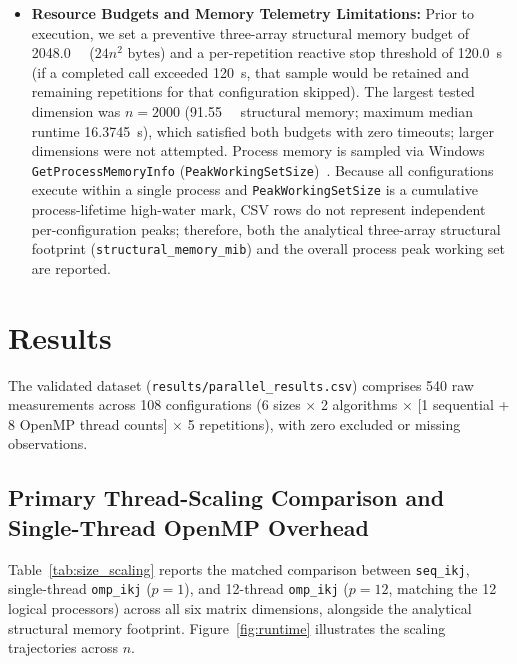 \documentclass[11pt,a4paper]{article}
\begin{document}
\begin{itemize}
    \item \textbf{Resource Budgets and Memory Telemetry Limitations:} Prior to execution, we set a preventive three-array structural memory budget of \SI{2048.0}{\mebi\byte} ($24n^2\text{ bytes}$) and a per-repetition reactive stop threshold of \SI{120.0}{\second} (if a completed call exceeded \SI{120}{\second}, that sample would be retained and remaining repetitions for that configuration skipped). The largest tested dimension was $n = 2000$ (\SI{91.55}{\mebi\byte} structural memory; maximum median runtime \SI{16.3745}{\second}), which satisfied both budgets with zero timeouts; larger dimensions were not attempted. Process memory is sampled via Windows \texttt{GetProcessMemoryInfo} (\texttt{PeakWorkingSetSize})~\cite{msmemory}. Because all configurations execute within a single process and \texttt{PeakWorkingSetSize} is a cumulative process-lifetime high-water mark, CSV rows do not represent independent per-configuration peaks; therefore, both the analytical three-array structural footprint (\texttt{structural\_memory\_mib}) and the overall process peak working set are reported.
\end{itemize}

\section{Results}
The validated dataset (\texttt{results/parallel\_results.csv}) comprises 540 raw measurements across 108 configurations (6 sizes $\times$ 2 algorithms $\times$ [1 sequential + 8 OpenMP thread counts] $\times$ 5 repetitions), with zero excluded or missing observations.

\subsection{Primary Thread-Scaling Comparison and Single-Thread OpenMP Overhead}
Table~\ref{tab:size_scaling} reports the matched comparison between \texttt{seq\_ikj}, single-thread \texttt{omp\_ikj} ($p=1$), and 12-thread \texttt{omp\_ikj} ($p=12$, matching the 12 logical processors) across all six matrix dimensions, alongside the analytical structural memory footprint. Figure~\ref{fig:runtime} illustrates the scaling trajectories across $n$.
\end{document}
